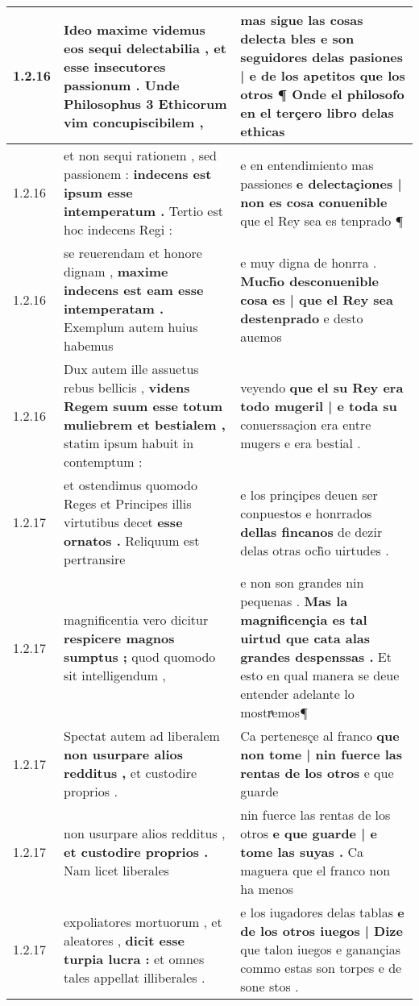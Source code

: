 \begin{tabular}{|p{1cm}|p{6.5cm}|p{6.5cm}|}
1.2.16 & Ideo maxime videmus eos sequi delectabilia , \textbf{ et esse insecutores passionum . } Unde Philosophus 3 Ethicorum vim concupiscibilem , & mas sigue las cosas delecta bles \textbf{ e son seguidores delas pasiones | e de los apetitos que los otros } ¶ Onde el philosofo en el terçero libro delas ethicas \\\hline
1.2.16 & et non sequi rationem , sed passionem : \textbf{ indecens est ipsum esse intemperatum . } Tertio est hoc indecens Regi : & e en entendimiento mas passiones \textbf{ e delectaçiones | non es cosa conuenible } que el Rey sea es tenprado ¶ \\\hline
1.2.16 & se reuerendam et honore dignam , \textbf{ maxime indecens est eam esse intemperatam . } Exemplum autem huius habemus & e muy digna de honrra . \textbf{ Much̃o desconuenible cosa es | que el Rey sea destenprado } e desto auemos \\\hline
1.2.16 & Dux autem ille assuetus rebus bellicis , \textbf{ videns Regem suum esse totum muliebrem et bestialem , } statim ipsum habuit in contemptum : & veyendo \textbf{ que el su Rey era todo mugeril | e toda su } conuerssaçion era entre mugers e era bestial . \\\hline
1.2.17 & et ostendimus quomodo Reges et Principes illis virtutibus decet \textbf{ esse ornatos . } Reliquum est pertransire & e los prinçipes deuen ser conpuestos e honrrados \textbf{ dellas fincanos } de dezir delas otras och̃o uirtudes . \\\hline
1.2.17 & magnificentia vero dicitur \textbf{ respicere magnos sumptus ; } quod quomodo sit intelligendum , & e non son grandes nin pequenas . \textbf{ Mas la magnificençia es tal uirtud que cata alas grandes despenssas . } Et esto en qual manera se deue entender adelante lo mostrͣemos¶ \\\hline
1.2.17 & Spectat autem ad liberalem \textbf{ non usurpare alios redditus , } et custodire proprios . & Ca pertenesçe al franco \textbf{ que non tome | nin fuerce las rentas de los otros } e que guarde \\\hline
1.2.17 & non usurpare alios redditus , \textbf{ et custodire proprios . } Nam licet liberales & nin fuerce las rentas de los otros \textbf{ e que guarde | e tome las suyas . } Ca maguera que el franco non ha menos \\\hline
1.2.17 & expoliatores mortuorum , et aleatores , \textbf{ dicit esse turpia lucra : } et omnes tales appellat illiberales . & e los iugadores delas tablas \textbf{ e de los otros iuegos | Dize } que talon iuegos e ganançias commo estas son torpes e de sone stos . \\\hline

\end{tabular}
